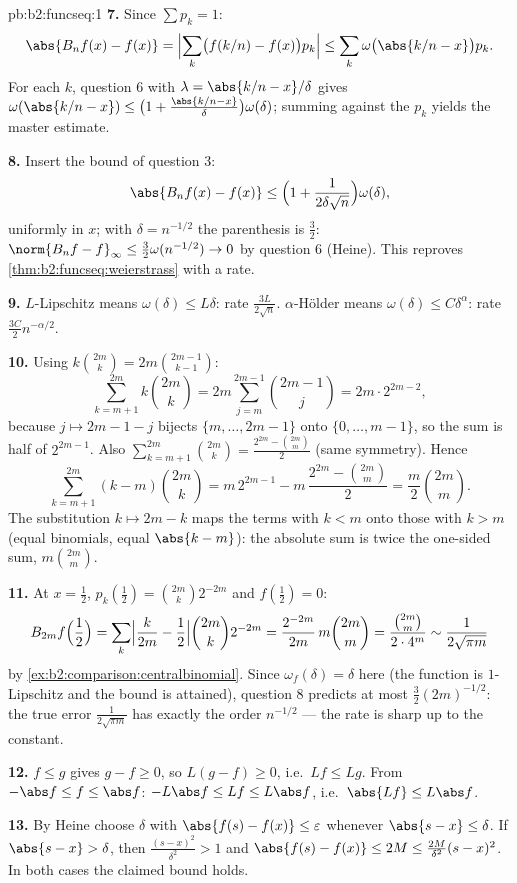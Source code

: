 \begin{solution}{pb:b2:funcseq:1}
\textbf{7.} Since $\sum p_k = 1$:
\[
\abs{B_nf(x) - f(x)}
= \Bigl|\sum_k\bigl(f(k/n) - f(x)\bigr)p_k\Bigr|
\leq \sum_k\omega\bigl(\abs{k/n - x}\bigr)p_k .
\]
For each $k$, question 6 with $\lambda = \abs{k/n - x}/\delta$
gives $\omega(\abs{k/n-x}) \leq \bigl(1 +
\frac{\abs{k/n-x}}\delta\bigr)\omega(\delta)$; summing against
the $p_k$ yields the master estimate.

\textbf{8.} Insert the bound of question 3:
\[
\abs{B_nf(x) - f(x)} \leq \Bigl(1 +
\frac{1}{2\delta\sqrt n}\Bigr)\omega(\delta),
\]
uniformly in $x$; with $\delta = n^{-1/2}$ the parenthesis is
$\frac32$: $\norm{B_nf - f}_\infty \leq
\frac32\omega(n^{-1/2}) \to 0$ by question 6 (Heine). This
reproves \cref{thm:b2:funcseq:weierstrass} with a rate.

\textbf{9.} $L$-Lipschitz means $\omega(\delta) \leq L\delta$:
rate $\frac{3L}{2\sqrt n}$. $\alpha$-H\"older means
$\omega(\delta) \leq C\delta^\alpha$: rate $\frac{3C}{2}
n^{-\alpha/2}$.

\textbf{10.} Using $k\binom{2m}k = 2m\binom{2m-1}{k-1}$:
\[
\sum_{k=m+1}^{2m}k\binom{2m}k
= 2m\sum_{j=m}^{2m-1}\binom{2m-1}{j}
= 2m\cdot 2^{2m-2},
\]
because $j \mapsto 2m-1-j$ bijects $\{m,\dots,2m-1\}$ onto
$\{0,\dots,m-1\}$, so the sum is half of $2^{2m-1}$. Also
$\sum_{k=m+1}^{2m}\binom{2m}k = \frac{2^{2m} -
\binom{2m}m}{2}$ (same symmetry). Hence
\[
\sum_{k=m+1}^{2m}(k-m)\binom{2m}k
= m\,2^{2m-1} - m\,\frac{2^{2m} - \binom{2m}m}{2}
= \frac m2\binom{2m}m .
\]
The substitution $k \mapsto 2m-k$ maps the terms with $k < m$
onto those with $k > m$ (equal binomials, equal $\abs{k-m}$):
the absolute sum is twice the one-sided sum, $m\binom{2m}m$.

\textbf{11.} At $x = \frac12$, $p_k(\tfrac12) =
\binom{2m}k2^{-2m}$ and $f(\tfrac12) = 0$:
\[
B_{2m}f\Bigl(\frac12\Bigr)
= \sum_k\Bigl|\frac{k}{2m} - \frac12\Bigr|
\binom{2m}k 2^{-2m}
= \frac{2^{-2m}}{2m}\,m\binom{2m}m
= \frac{\binom{2m}m}{2\cdot4^m}
\sim \frac{1}{2\sqrt{\pi m}}
\]
by \cref{ex:b2:comparison:centralbinomial}. Since $\omega_f
(\delta) = \delta$ here (the function is $1$-Lipschitz and the
bound is attained), question 8 predicts at most
$\frac32(2m)^{-1/2}$: the true error $\frac{1}{2\sqrt{\pi m}}$
has exactly the order $n^{-1/2}$ --- the rate is sharp up to
the constant.

\textbf{12.} $f \leq g$ gives $g - f \geq 0$, so $L(g-f) \geq
0$, i.e.\ $Lf \leq Lg$. From $-\abs f \leq f \leq \abs f$:
$-L\abs f \leq Lf \leq L\abs f$, i.e.\ $\abs{Lf} \leq
L\abs f$.

\textbf{13.} By Heine choose $\delta$ with $\abs{f(s)-f(x)}
\leq \varepsilon$ whenever $\abs{s-x} \leq \delta$. If
$\abs{s - x} > \delta$, then $\frac{(s-x)^2}{\delta^2} > 1$ and
$\abs{f(s)-f(x)} \leq 2M \leq \frac{2M}{\delta^2}(s-x)^2$. In
both cases the claimed bound holds.


\end{solution}

